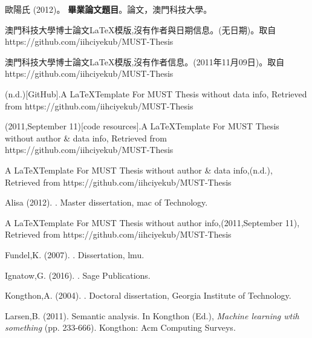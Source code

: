 \begin{thebibliography}{}
歐陽氏 (2012)。
\newblock \textbf{畢業論文題目}。論文，澳門科技大學。

澳門科技大學博士論文\LaTeX 模版,沒有作者與日期信息。(无日期)。取自 https://github.com/iihciyekub/MUST-Thesis

澳門科技大學博士論文\LaTeX 模版,沒有作者信息。(2011年11月09日)。取自 https://github.com/iihciyekub/MUST-Thesis


\iiname(n.d.)[GitHub].A \LaTeX Template For MUST Thesis without data info, Retrieved from https://github.com/iihciyekub/MUST-Thesis

\iiname(2011,September 11)[code resources].A \LaTeX Template For MUST Thesis without author \& data info, Retrieved from https://github.com/iihciyekub/MUST-Thesis

A \LaTeX Template For MUST Thesis without author \& data info,(n.d.), Retrieved from https://github.com/iihciyekub/MUST-Thesis

Alisa (2012).
. Master dissertation,  mac of Technology.

A \LaTeX Template For MUST Thesis without author info,(2011,September 11), Retrieved from https://github.com/iihciyekub/MUST-Thesis

Fundel,K. (2007).
. Dissertation, lmu.

Ignatow,G. (2016).
. Sage Publications.

Kongthon,A. (2004).
. Doctoral dissertation, Georgia Institute of Technology.

Larsen,B. (2011).
\newblock  Semantic analysis. In Kongthon (Ed.), {\em Machine learning wtih something} (pp. 233-666). Kongthon: Acm Computing Surveys.


\end{thebibliography}
